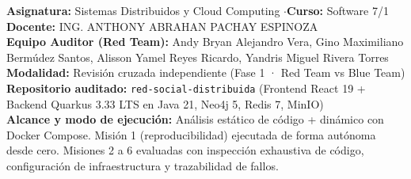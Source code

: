 \documentclass[10pt,a4paper]{article}
\begin{document}
\begin{tcolorbox}[colback=lightgray!50,colframe=upseblue!35,arc=2mm]
\small
\textbf{Asignatura:} Sistemas Distribuidos y Cloud Computing \quad$\cdot$\quad \textbf{Curso:} Software 7/1\\
\textbf{Docente:} ING. ANTHONY ABRAHAN PACHAY ESPINOZA\\
\textbf{Equipo Auditor (Red Team):} Andy Bryan Alejandro Vera, Gino Maximiliano Bermúdez Santos, Alisson Yamel Reyes Ricardo, Yandris Miguel Rivera Torres\\[0.2cm]
\textbf{Modalidad:} Revisión cruzada independiente (Fase 1 · Red Team vs Blue Team)\\
\textbf{Repositorio auditado:} \texttt{red-social-distribuida} (Frontend React 19 + Backend Quarkus 3.33 LTS en Java 21, Neo4j 5, Redis 7, MinIO)\\
\textbf{Alcance y modo de ejecución:} Análisis estático de código + dinámico con Docker Compose. Misión 1 (reproducibilidad) ejecutada de forma autónoma desde cero. Misiones 2 a 6 evaluadas con inspección exhaustiva de código, configuración de infraestructura y trazabilidad de fallos.
\end{tcolorbox}
\vspace{0.8em}
\end{document}
